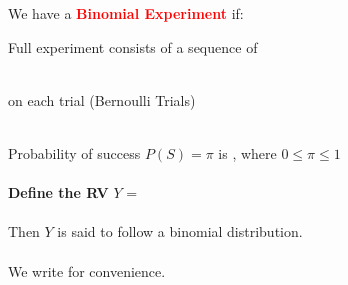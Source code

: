 We have a \textbf{\textcolor{red}{Binomial Experiment}} if:
\be
\item Full experiment consists of a sequence of \underbar{~~~~~~~~~~~~~~~~~~~~~~~~~~~~~~~~~~~~~~~~~~~~~~~~~}\\~\\
\item \underbar{~~~~~~~~~~~~~~~~~~~~~~~~~~~~~~~~~~~~~~~~~~~~~~~~~~~~~~~~~~~~~~~~~~~~~~~~~~~~~~~~~} on each trial (Bernoulli Trials)\\~\\
\item Probability of success $P(S) = \pi$ is \underbar{~~~~~~~~~~~~~~~~~~~~~~~~~~~~~~~~~~~~~~~~~~~~~~~~~}, where $0 \leq \pi \leq 1$\\~\\
\ee
\textbf{Define the RV} $Y$ = \underbar{~~~~~~~~~~~~~~~~~~~~~~~~~~~~~~~~~~~~~~~~~~~~~~~~~~~~~~~~~~~~~~~}\\~\\
Then $Y$ is said to follow a binomial distribution.\\~\\
We write \underbar{~~~~~~~~~~~~~~~~~~~~~~~~~~~~~~~~~~~~~~~~~~~~~~~~~~~~~~~~~~~~~~~} for convenience.\\~\\

